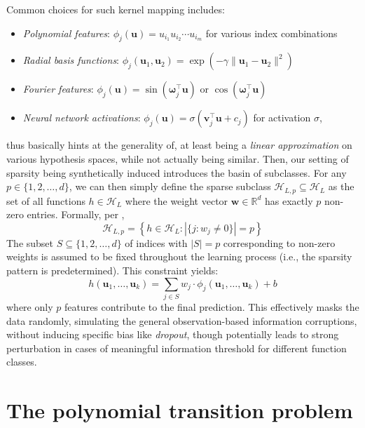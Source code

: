 \documentclass[
  journal=largetwo,
  year=2025,
  volume=37,
]{cup-journal}
\begin{document}
Common choices for such kernel mapping includes:
\begin{itemize}
    \item \textit{Polynomial features}: $\phi_j(\mathbf{u}) = u_{i_1} u_{i_2} \cdots u_{i_m}$ for various index combinations
    \item \textit{Radial basis functions}: $\phi_j(\mathbf{u}_1, \mathbf{u}_2) = \exp(-\gamma \|\mathbf{u}_1 - \mathbf{u}_2\|^2)$
    \item \textit{Fourier features}: $\phi_j(\mathbf{u}) = \sin(\boldsymbol{\omega}_j^{\top}\mathbf{u})$ or $\cos(\boldsymbol{\omega}_j^{\top}\mathbf{u})$
    \item \textit{Neural network activations}: $\phi_j(\mathbf{u}) = \sigma(\mathbf{v}_j^{\top}\mathbf{u} + c_j)$ for activation $\sigma$,
\end{itemize}
thus basically hints at the generality of, at least being a \textit{linear approximation} on various hypothesis spaces, while not actually being similar. Then, our setting of sparsity being synthetically induced introduces the basin of subclasses. For any $p \in \{1, 2, \ldots, d\}$, we can then simply define the sparse subclass $\mathcal{H}_{L,p} \subseteq \mathcal{H}_{L}$ as the set of all functions $h \in \mathcal{H}_{L}$ where the weight vector $\mathbf{w} \in \mathbb{R}^{d}$ has exactly $p$ non-zero entries. Formally, per \cite{lafon_understanding_2024},
\begin{equation}
        \mathcal{H}_{L,p} = \left\{ h \in \mathcal{H}_{L} : |\{j : w_j \neq 0\}| = p \right\}
\end{equation}
The subset $S \subseteq \{1, 2, \ldots, d\}$ of indices with $|S| = p$ corresponding to non-zero weights is assumed to be fixed throughout the learning process (i.e., the sparsity pattern is predetermined). This constraint yields:
\begin{equation}
    h(\mathbf{u}_1, \ldots, \mathbf{u}_k) = \sum_{j \in S} w_j \cdot \phi_j(\mathbf{u}_1, \ldots, \mathbf{u}_k) + b
\end{equation}
where only $p$ features contribute to the final prediction. This effectively masks the data randomly, simulating the general observation-based information corruptions, without inducing specific bias like \textit{dropout}, though potentially leads to strong perturbation in cases of meaningful information threshold for different function classes. 

\section{The polynomial transition problem}
\end{document}
